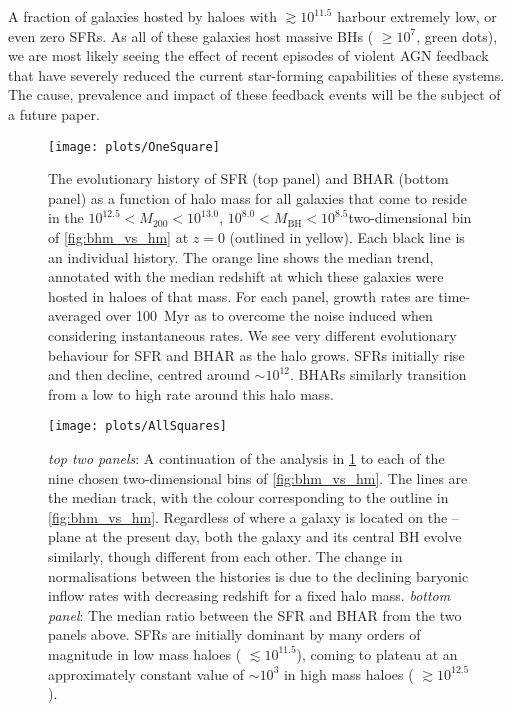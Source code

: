 A fraction of galaxies hosted by haloes with  $\gtrsim 10^{11.5}$\Msol
harbour extremely low, or even zero SFRs. As all of these galaxies host massive
BHs ( $\geq 10^{7}$\Msol, green dots), we are most likely seeing the
effect of recent episodes of violent AGN feedback that have severely reduced
the current star-forming capabilities of these systems.  The cause, prevalence
and impact of these feedback events will be the subject of a future paper.

\begin{figure}
\texttt{[image: plots/OneSquare]}

\caption{The evolutionary history of SFR (top panel) and BHAR (bottom panel) as
a function of halo mass for all galaxies that come to reside in the $10^{12.5}
< M_{\mathrm{200}} < 10^{13.0}$\Msol, $10^{8.0} < M_{\mathrm{BH}} <
10^{8.5}$\Msol two-dimensional bin of \cref{fig:bhm_vs_hm} at $z=0$ (outlined
in yellow). Each black line is an individual history. The orange line shows the
median trend, annotated with the median redshift at which these galaxies were
hosted in haloes of that mass.  For each panel, growth rates are time-averaged
over 100~Myr as to overcome the noise induced when considering instantaneous
rates.  We see very different evolutionary behaviour for SFR and BHAR as the
halo grows. SFRs initially rise and then decline, centred around  $\sim
10^{12}$\Msol. BHARs similarly transition from a low to high rate around this
halo mass.}

\label{fig:one_square} \end{figure}

\begin{figure}
\texttt{[image: plots/AllSquares]}

\caption{\textit{top two panels}: A continuation of the analysis in
\cref{fig:one_square} to each of the nine chosen two-dimensional bins of
\cref{fig:bhm_vs_hm}. The lines are the median track, with the colour
corresponding to the outline in \cref{fig:bhm_vs_hm}. Regardless of where a
galaxy is located on the -- plane at the present day, both the
galaxy and its central BH evolve similarly, though different from each other.
The change in normalisations between the histories is due to the declining
baryonic inflow rates with decreasing redshift for a fixed halo mass.
\textit{bottom panel}: The median ratio between the SFR and BHAR from the two
panels above. SFRs are initially dominant by many orders of magnitude in low
mass haloes ( $\lesssim 10^{11.5}$\Msol), coming to plateau at an
approximately constant value of $\sim 10^{3}$ in high mass haloes (
$\gtrsim 10^{12.5}$\Msol).}

\label{fig:avHistory_vs_hm}
\end{figure}

